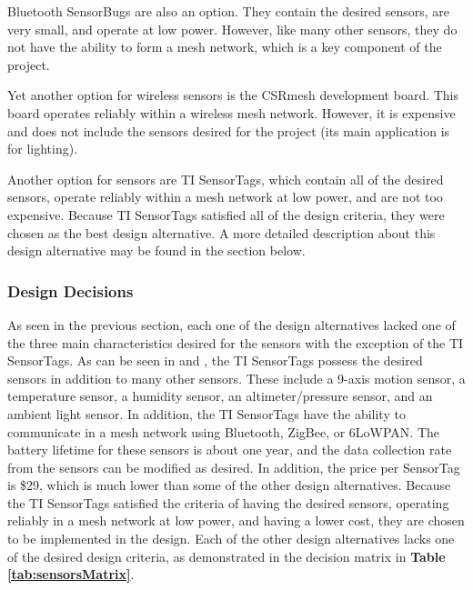 \documentclass[PPFS.tex]{template/subfiles}
\begin{document}
Bluetooth SensorBugs are also an option. They contain the desired sensors, are very small, and operate at low power. However, like many other sensors, they do not have the ability to form a mesh network, which is a key component of the project. \cite{Bluetooth}

Yet another option for wireless sensors is the CSRmesh development board. This board operates reliably within a wireless mesh network. However, it is expensive and does not include the sensors desired for the project (its main application is for lighting). \cite{CSRmesh}

Another option for sensors are TI SensorTags, which contain all of the desired sensors, operate reliably within a mesh network at low power, and are not too expensive. Because TI SensorTags satisfied all of the design criteria, they were chosen as the best design alternative. A more detailed description about this design alternative may be found in the section below. \cite{SensorTag}

\subsubsection{Design Decisions}

As seen in the previous section, each one of the design alternatives lacked one of the three main characteristics desired for the sensors with the exception of the TI SensorTags. As can be seen in  and , the TI SensorTags possess the desired sensors in addition to many other sensors. These include a 9-axis motion sensor, a temperature sensor, a humidity sensor, an altimeter/pressure sensor, and an ambient light sensor. In addition, the TI SensorTags have the ability to communicate in a mesh network using Bluetooth, ZigBee, or 6LoWPAN. The battery lifetime for these sensors is about one year, and the data collection rate from the sensors can be modified as desired. In addition, the price per SensorTag is \$29, which is much lower than some of the other design alternatives. Because the TI SensorTags satisfied the criteria of having the desired sensors, operating reliably in a mesh network at low power, and having a lower cost, they are chosen to be implemented in the design. Each of the other design alternatives lacks one of the desired design criteria, as demonstrated in the decision matrix in \textbf{Table \ref{tab:sensorsMatrix}}. \cite{SensorTag}
\end{document}
